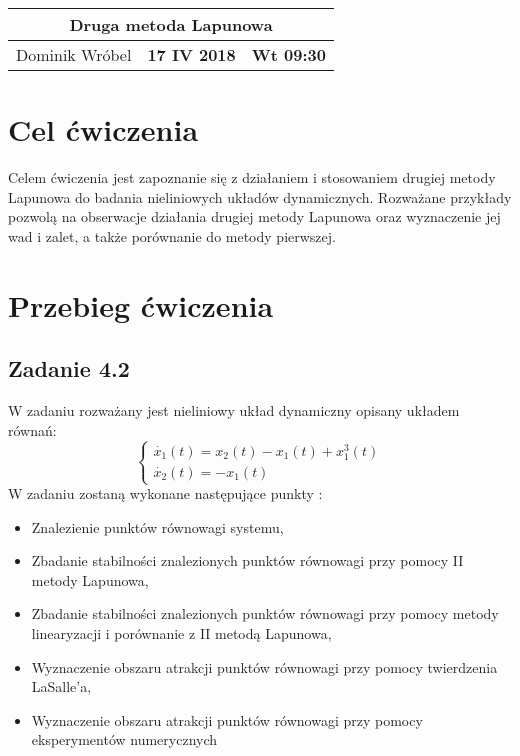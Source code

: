 \documentclass[a4paper,11pt]{article}
\begin{document}
\begin{table}
\begin{center}
\begin{tabular}{|l|l|l|}
\hline
\multicolumn{3}{|c|}{\textbf{Druga metoda Lapunowa}} \\ \hline Dominik Wróbel & \textbf{17 IV 2018} & \textbf{Wt 09:30} \\ \hline

\end{tabular}
\end{center}
\end{table}
\tableofcontents

\section{Cel ćwiczenia}
Celem ćwiczenia jest zapoznanie się z działaniem i stosowaniem drugiej metody Lapunowa do badania nieliniowych układów dynamicznych. Rozważane przykłady pozwolą na obserwacje działania drugiej metody Lapunowa oraz wyznaczenie jej wad i zalet, a także porównanie do metody pierwszej.
\section{Przebieg ćwiczenia}
\subsection{Zadanie 4.2}
W zadaniu rozważany jest nieliniowy układ dynamiczny opisany układem równań: 
\begin{equation*}
\begin{cases}
\dot{x_{1}}(t)=x_{2}(t)-x_{1}(t)+x_{1}^{3}(t) \\
\dot{x_{2}}(t)=-x_{1}(t)
\end{cases}
\end{equation*}
\newpage
W zadaniu zostaną wykonane następujące punkty :
\begin{itemize}
\item Znalezienie punktów równowagi systemu,
\item Zbadanie stabilności znalezionych punktów równowagi przy pomocy II metody Lapunowa, 
\item Zbadanie stabilności znalezionych punktów równowagi przy pomocy metody linearyzacji i porównanie z II metodą Lapunowa,
\item Wyznaczenie obszaru atrakcji punktów równowagi przy pomocy twierdzenia LaSalle'a,
\item Wyznaczenie obszaru atrakcji punktów równowagi przy pomocy eksperymentów numerycznych
\end{itemize}
\end{document}
